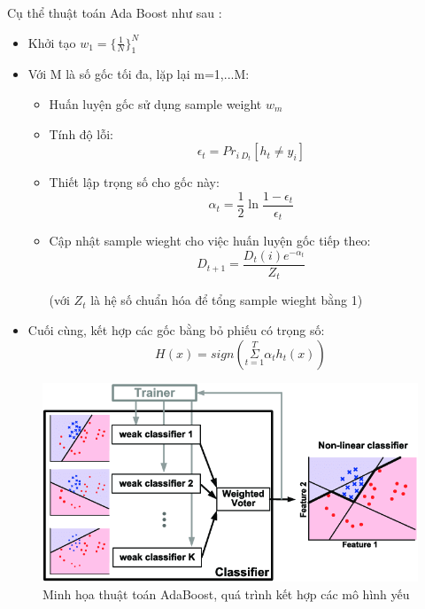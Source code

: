         Cụ thể thuật toán Ada Boost như sau \cite{freund1999short}:
        \begin{itemize}
            \item Khởi tạo $w_{1} = \{\frac{1}{N}\}^{N}_{1}$
            
            \item Với M là số gốc tối đa, lặp lại m=1,...M:
            \begin{itemize}
                \item Huấn luyện gốc sử dụng sample weight $w_{m}$
                
                \item Tính độ lỗi: 
                \begin{equation}
                    \epsilon_{t} = Pr_{i~D_{t}} [ h_{t} \ne y_{i} ]
                \end{equation}
                
                \item Thiết lập trọng số cho gốc này:
                    \begin{equation}
                        \alpha_{t} = \frac{1}{2}\ln{\frac{1 - \epsilon_{t}}{\epsilon_{t}}}
                    \end{equation}
                
                \item Cập nhật sample wieght cho việc huấn luyện gốc tiếp theo:
                    \begin{equation}
                        D_{t+1} = \frac{D_{t}(i)e^{-\alpha_{t}}}
                        {Z_{t}}
                    \end{equation}

                (với $Z_{t}$ là hệ số chuẩn hóa để tổng sample wieght bằng 1)
                
            \end{itemize}
            
            \item Cuối cùng, kết hợp các gốc bằng bỏ phiếu có trọng số:
                \begin{equation}
                    H(x) = sign( \underset{t=1}{ \overset{T}{\Sigma}} \alpha_{t} h_{t}(x) )
                \end{equation}
                \vspace{0.5cm}
    \clearpage
        \end{itemize}
        \clearpage
        \begin{figure}[H]
        \centering
        \includegraphics[width=8.5 cm,]{images/adaboost.png}
        \caption{Minh họa thuật toán AdaBoost, quá trình kết hợp các mô hình yếu \cite{adab_pic}}
        \label{fig:adab}
        \end{figure}
        
